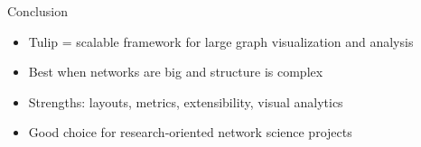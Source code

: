 \begin{frame}{Conclusion}
	\begin{itemize}
		\item Tulip = scalable framework for large graph visualization and analysis
		\item Best when networks are big and structure is complex
		\item Strengths: layouts, metrics, extensibility, visual analytics
		\item Good choice for research‑oriented network science projects
	\end{itemize}
\end{frame}